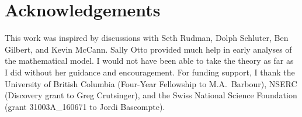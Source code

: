 \documentclass[11pt,]{article}
\begin{document}
\section{Acknowledgements}\label{acknowledgements}

This work was inspired by discussions with Seth Rudman, Dolph Schluter,
Ben Gilbert, and Kevin McCann. Sally Otto provided much help in early
analyses of the mathematical model. I would not have been able to take
the theory as far as I did without her guidance and encouragement. For
funding support, I thank the University of British Columbia (Four-Year
Fellowship to M.A.~Barbour), NSERC (Discovery grant to Greg Crutsinger),
and the Swiss National Science Foundation (grant 31003A\_160671 to Jordi
Bascompte).


\end{document}
